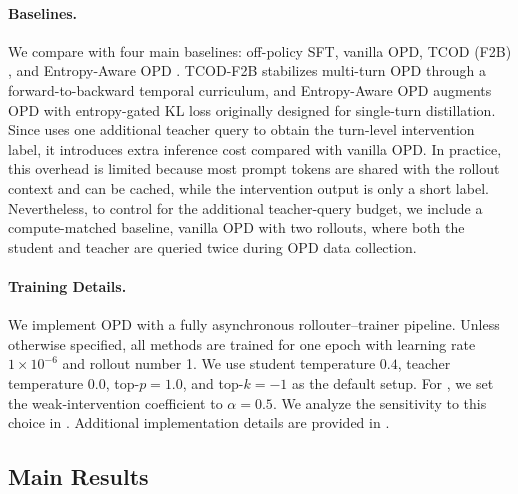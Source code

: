 \paragraph{Baselines.}
We compare \ours{} with four main baselines: off-policy SFT, vanilla OPD, TCOD (F2B) \citep{wang2026tcod}, and Entropy-Aware OPD \citep{jin2026entropy}. TCOD-F2B stabilizes multi-turn OPD through a forward-to-backward temporal curriculum, and Entropy-Aware OPD augments OPD with entropy-gated KL loss originally designed for single-turn distillation. 
%
Since \ours{} uses one additional teacher query to obtain the turn-level intervention label, it introduces extra inference cost compared with vanilla OPD.
%
In practice, this overhead is limited because most prompt tokens are shared with the rollout context and can be cached, while the intervention output is only a short label.
%
Nevertheless, to control for the additional teacher-query budget, we include a compute-matched baseline, vanilla OPD with two rollouts, where both the student and teacher are queried twice during OPD data collection.

\paragraph{Training Details.}
We implement OPD with a fully asynchronous rollouter--trainer pipeline. Unless otherwise specified, all methods are trained for one epoch with learning rate $1\times10^{-6}$ and rollout number 1. We use student temperature $0.4$, teacher temperature $0.0$, top-$p=1.0$, and top-$k=-1$ as the default setup. For \ours{}, we set the weak-intervention coefficient to $\alpha=0.5$. We analyze the sensitivity to this choice in . Additional implementation details are provided in .


\subsection{Main Results}
\label{sec:result_analysis}

